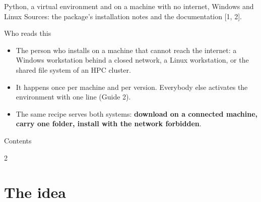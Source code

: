 \documentclass[aspectratio=169,11pt]{beamer}
\begin{document}
  {Python, a virtual environment and \pkgname{} on a machine with no internet, Windows and Linux}
  {Sources: the package's installation notes and the  documentation [1, 2].}

\begin{frame}{Who reads this}
\begin{itemize}
  \item The person who installs \pkgname{} on a machine that cannot reach the
        internet: a Windows workstation behind a closed network, a Linux
        workstation, or the shared file system of an HPC cluster.
  \item It happens once per machine and per version. Everybody else activates
        the environment with one line (Guide 2).
  \item The same recipe serves both systems: \textbf{download on a connected
        machine, carry one folder, install with the network forbidden}.
\end{itemize}
\end{frame}

\begin{frame}{Contents}
\small
\begin{multicols}{2}
\tableofcontents
\end{multicols}
\end{frame}

\section{The idea}
\end{document}

